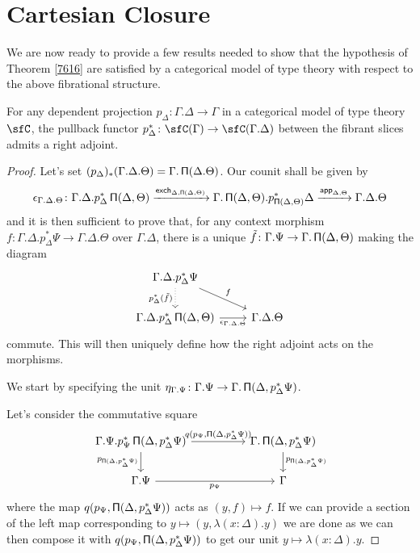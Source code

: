 \section{Cartesian Closure}

We are now ready to provide a few results needed to show that the hypothesis of
Theorem \ref{7616} are satisfied by a categorical
model of type theory with respect to the above fibrational structure.

\begin{lem}\label{radj}
  For any dependent projection $p_\Delta\colon\Gamma.\Delta\rightarrow\Gamma$ in
  a categorical model of type theory $\sfC$, the pullback functor
  $p_\Delta^*\colon\sfC(\Gamma)\rightarrow\sfC(\Gamma.\Delta)$ between the fibrant
  slices admits a right adjoint.
\end{lem}
\begin{proof}

  Let's set $(p_\Delta)_*(\Gamma.\Delta.\Theta)=\Gamma.\operatorname{\mathsf{\Pi}}(\Delta.\Theta)$. Our
  counit shall be given by
  \[\epsilon_{\Gamma.\Delta.\Theta}\colon\Gamma.\Delta.p^*_\Delta\operatorname{\mathsf{\Pi}}(\Delta,\Theta)
  \xrightarrow{\operatorname{\mathsf{exch}}_{\Delta,\operatorname{\mathsf{\Pi}}(\Delta,\Theta)}}\Gamma.\operatorname{\mathsf{\Pi}}(\Delta,\Theta).p^*_{\operatorname{\mathsf{\Pi}}(\Delta,\Theta)}\Delta
  \xrightarrow{\operatorname{\mathsf{app}}_{\Delta,\Theta}}\Gamma.\Delta.\Theta\]
  and it is then sufficient to prove that, for any context morphism
  $f\colon\Gamma.\Delta.p^*_\Delta\Psi\rightarrow\Gamma.\Delta.\Theta$ over
  $\Gamma.\Delta$, there is
  a unique $\tilde{f}\colon\Gamma.\Psi\rightarrow\Gamma.\operatorname{\mathsf{\Pi}}(\Delta,\Theta)$
  making the diagram
  \[\begin{tikzcd}
    {\Gamma.\Delta.p^*_\Delta\Psi} \\
    {\Gamma.\Delta.p^*_\Delta\Pis(\Delta,\Theta)} & {\Gamma.\Delta.\Theta}
    \arrow["f", from=1-1, to=2-2]
    \arrow["{\epsilon_{\Gamma.\Delta.\Theta}}"', from=2-1, to=2-2]
    \arrow["{p^*_\Delta(\tilde{f})}"', dotted, from=1-1, to=2-1]
  \end{tikzcd}\]
  commute. This will then uniquely define how the right adjoint acts on the
  morphisms.

  We start by specifying the unit
  $\eta_{\Gamma.\Psi}\colon\Gamma.\Psi\rightarrow\Gamma.\operatorname{\mathsf{\Pi}}(\Delta,p^*_{\Delta}\Psi)$.

  Let's consider the commutative square
  \[\begin{tikzcd}[column sep=huge]
    {\Gamma.\Psi.p^*_\Psi\Pis(\Delta,p^*_\Delta\Psi)} & {\Gamma.\Pis(\Delta,p^*_\Delta\Psi)} \\
    {\Gamma.\Psi} & \Gamma
    \arrow["{p_{\Pis(\Delta,p^*_\Delta\Psi)}}"', from=1-1, to=2-1]
    \arrow["{p_{\Psi}}"', from=2-1, to=2-2]
    \arrow["{p_{\Pis(\Delta,p^*_\Delta\Psi)}}", from=1-2, to=2-2]
    \arrow["{q(p_\Psi,\Pis(\Delta,p^*_\Delta\Psi))}", from=1-1, to=1-2]
  \end{tikzcd}\]
  where the map $q(p_\Psi,\operatorname{\mathsf{\Pi}}(\Delta,p^*_\Delta\Psi))$ acts as $(y,f)\mapsto
  f$. If we can provide a section of the left map
  corresponding to $y\mapsto(y,\lambda(x:\Delta).y)$ we are
  done as we can then compose
  it with $q(p_\Psi,\operatorname{\mathsf{\Pi}}(\Delta,p^*_\Delta\Psi))$ to get our unit
  $y\mapsto\lambda(x:\Delta).y$.
  

\end{proof}
